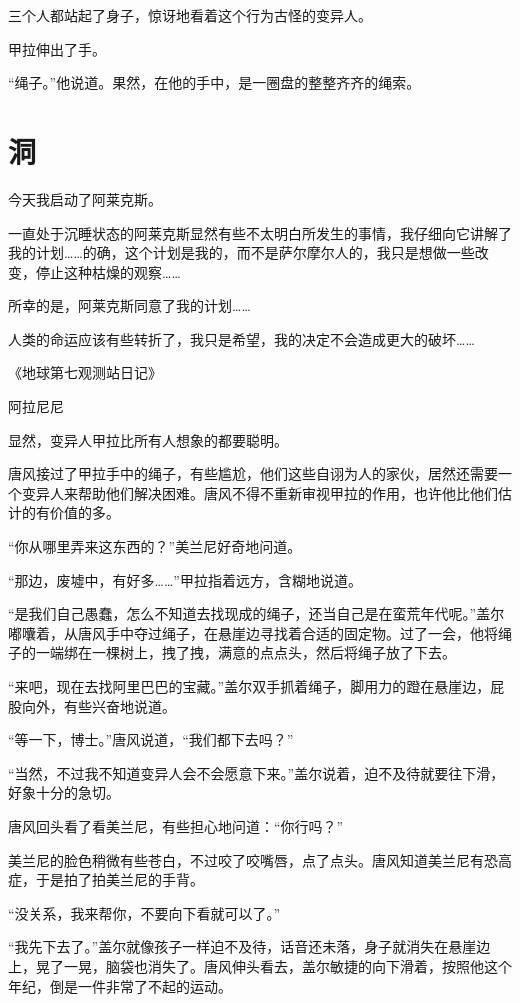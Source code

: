 三个人都站起了身子，惊讶地看着这个行为古怪的变异人。

甲拉伸出了手。

“绳子。”他说道。果然，在他的手中，是一圈盘的整整齐齐的绳索。

\chapter{洞}

今天我启动了阿莱克斯。

一直处于沉睡状态的阿莱克斯显然有些不太明白所发生的事情，我仔细向它讲解了我的计划……的确，这个计划是我的，而不是萨尔摩尔人的，我只是想做一些改变，停止这种枯燥的观察……

所幸的是，阿莱克斯同意了我的计划……

人类的命运应该有些转折了，我只是希望，我的决定不会造成更大的破坏……

《地球第七观测站日记》

阿拉尼尼

显然，变异人甲拉比所有人想象的都要聪明。

唐风接过了甲拉手中的绳子，有些尴尬，他们这些自诩为人的家伙，居然还需要一个变异人来帮助他们解决困难。唐风不得不重新审视甲拉的作用，也许他比他们估计的有价值的多。

“你从哪里弄来这东西的？”美兰尼好奇地问道。

“那边，废墟中，有好多……”甲拉指着远方，含糊地说道。

“是我们自己愚蠢，怎么不知道去找现成的绳子，还当自己是在蛮荒年代呢。”盖尔嘟囔着，从唐风手中夺过绳子，在悬崖边寻找着合适的固定物。过了一会，他将绳子的一端绑在一棵树上，拽了拽，满意的点点头，然后将绳子放了下去。

“来吧，现在去找阿里巴巴的宝藏。”盖尔双手抓着绳子，脚用力的蹬在悬崖边，屁股向外，有些兴奋地说道。

“等一下，博士。”唐风说道，“我们都下去吗？”

“当然，不过我不知道变异人会不会愿意下来。”盖尔说着，迫不及待就要往下滑，好象十分的急切。

唐风回头看了看美兰尼，有些担心地问道：“你行吗？”

美兰尼的脸色稍微有些苍白，不过咬了咬嘴唇，点了点头。唐风知道美兰尼有恐高症，于是拍了拍美兰尼的手背。

“没关系，我来帮你，不要向下看就可以了。”

“我先下去了。”盖尔就像孩子一样迫不及待，话音还未落，身子就消失在悬崖边上，晃了一晃，脑袋也消失了。唐风伸头看去，盖尔敏捷的向下滑着，按照他这个年纪，倒是一件非常了不起的运动。

